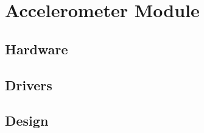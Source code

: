 

\section{Accelerometer  Module}

\subsection{Hardware}


\subsection{ Drivers}


\subsection {Design}






